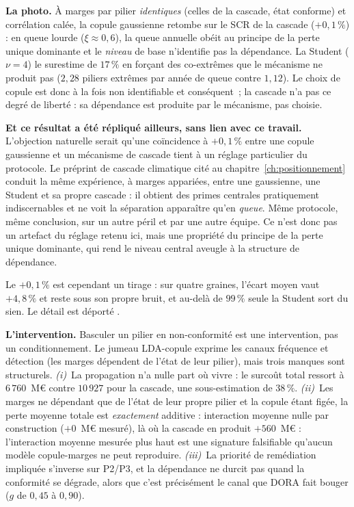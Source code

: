 \textbf{La photo.} À marges par pilier \emph{identiques} (celles de la cascade, état
conforme) et corrélation calée, la copule gaussienne retombe sur le SCR de la cascade
($+0{,}1\,\%$) : en queue lourde ($\xi \approx 0{,}6$), la queue annuelle obéit au principe
de la perte unique dominante et le \emph{niveau} de base n'identifie pas la dépendance. La
Student ($\nu = 4$) le surestime de $17\,\%$ en forçant des co-extrêmes que le mécanisme ne
produit pas ($2{,}28$ piliers extrêmes par année de queue contre $1{,}12$). Le choix de
copule est donc à la fois non identifiable et conséquent~; la cascade n'a pas ce degré de
liberté : sa dépendance est produite par le mécanisme, pas choisie.

\textbf{Et ce résultat a été répliqué ailleurs, sans lien avec ce travail.} L'objection naturelle
serait qu'une coïncidence à $+0{,}1\,\%$ entre une copule gaussienne et un mécanisme de cascade
tient à un réglage particulier du protocole. Le préprint de cascade climatique cité au
chapitre~\ref{ch:positionnement} \citep{ccrn2026} conduit la même expérience, à marges appariées,
entre une gaussienne, une Student et sa propre cascade : il obtient des primes centrales
pratiquement indiscernables et ne voit la séparation apparaître qu'en \emph{queue}. Même
protocole, même conclusion, sur un autre péril et par une autre équipe. Ce n'est donc pas un
artefact du réglage retenu ici, mais une propriété du principe de la perte unique dominante,
qui rend le niveau central aveugle à la structure de dépendance.

Le $+0{,}1\,\%$ est cependant un tirage : sur quatre graines, l'écart moyen vaut $+4{,}8\,\%$
et reste sous son propre bruit, et au-delà de $99\,\%$ seule la Student sort du sien. Le détail
est déporté \matcomp.

\textbf{L'intervention.} Basculer un pilier en non-conformité est une intervention, pas un
conditionnement. Le jumeau LDA-copule exprime les canaux fréquence et détection (les marges
dépendent de l'état de leur pilier), mais trois manques sont structurels.
\emph{(i)}~La propagation n'a nulle part où vivre : le surcoût total ressort à
$6\,760$~M\euro{} contre $10\,927$ pour la cascade, une sous-estimation de $38\,\%$.
\emph{(ii)}~Les marges ne dépendant que de l'état de leur propre pilier et la copule étant
figée, la perte moyenne totale est \emph{exactement} additive : interaction moyenne nulle
par construction ($+0$~M\euro{} mesuré), là où la cascade en produit $+560$~M\euro{} :
l'interaction moyenne mesurée plus haut est une signature falsifiable qu'aucun modèle
copule-marges ne peut reproduire. \emph{(iii)}~La priorité de remédiation impliquée
s'inverse sur P2/P3, et la dépendance ne durcit pas quand la conformité se dégrade, alors
que c'est précisément le canal que DORA fait bouger ($g$ de $0{,}45$ à $0{,}90$).

